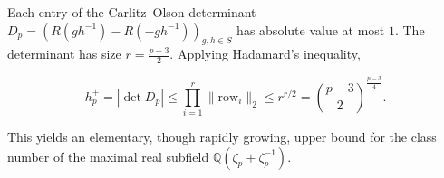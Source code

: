 Each entry of the Carlitz--Olson determinant $D_p = (R(gh^{-1}) - R(-gh^{-1}))_{g,h \in S}$ has absolute value at most $1$. The determinant has size $r = \frac{p-3}{2}$. Applying Hadamard's inequality,

$$h_p^+ = |\det D_p| \leq \prod_{i=1}^r \|\text{row}_i\|_2 \leq r^{r/2} = \left(\frac{p-3}{2}\right)^{\frac{p-3}{4}}.$$

This yields an elementary, though rapidly growing, upper bound for the class number of the maximal real subfield $\mathbb{Q}(\zeta_p + \zeta_p^{-1})$.
